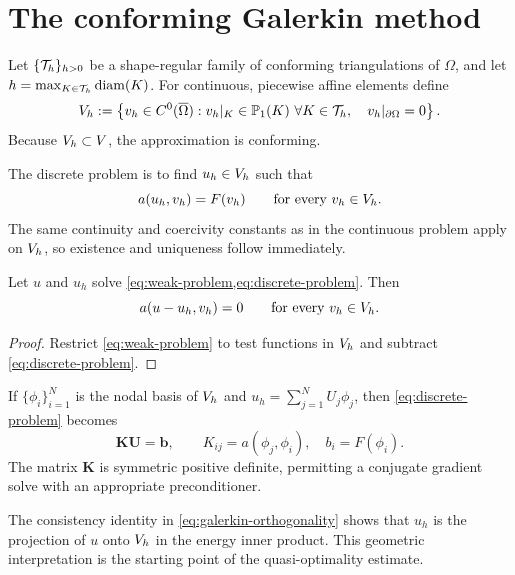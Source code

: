 \section{The conforming Galerkin method}
\label{sec:galerkin}

Let $\{\mathcal{T}_h\}_{h>0}$ be a shape-regular family of conforming triangulations of
$\Omega$, and let $h=\max_{K\in\mathcal{T}_h}\operatorname{diam}(K)$. For continuous,
piecewise affine elements define
\begin{equation}
  V_h
  :=\left\{v_h\in C^0(\overline\Omega):
  v_h|_K\in\mathbb P_1(K)\ \forall K\in\mathcal{T}_h,
  \quad v_h|_{\partial\Omega}=0\right\}.
  \label{eq:finite-element-space}
\end{equation}
Because $V_h\subset V$, the approximation is conforming.

The discrete problem is to find $u_h\in V_h$ such that
\begin{equation}
  a(u_h,v_h)=F(v_h)
  \qquad\text{for every }v_h\in V_h.
  \label{eq:discrete-problem}
\end{equation}
The same continuity and coercivity constants as in the continuous problem
apply on $V_h$, so existence and uniqueness follow immediately.

\begin{proposition}
\label{prop:galerkin-orthogonality}
Let $u$ and $u_h$ solve \cref{eq:weak-problem,eq:discrete-problem}. Then
\begin{equation}
  a(u-u_h,v_h)=0
  \qquad\text{for every }v_h\in V_h.
  \label{eq:galerkin-orthogonality}
\end{equation}
\end{proposition}

\begin{proof}
Restrict \cref{eq:weak-problem} to test functions in $V_h$ and subtract
\cref{eq:discrete-problem}.
\end{proof}

If $\{\phi_i\}_{i=1}^N$ is the nodal basis of $V_h$ and
$u_h=\sum_{j=1}^N U_j\phi_j$, then \cref{eq:discrete-problem} becomes
\begin{equation}
  \bm K\bm U=\bm b,
  \qquad
  K_{ij}=a(\phi_j,\phi_i),
  \quad
  b_i=F(\phi_i).
  \label{eq:linear-system}
\end{equation}
The matrix $\bm K$ is symmetric positive definite, permitting a conjugate
gradient solve with an appropriate preconditioner.

\begin{remark}
The consistency identity in \cref{eq:galerkin-orthogonality} shows that $u_h$
is the projection of $u$ onto $V_h$ in the energy inner product. This geometric
interpretation is the starting point of the quasi-optimality estimate.
\end{remark}

